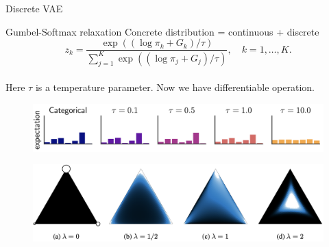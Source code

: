 \begin{frame}{Discrete VAE}
	\vspace{-0.3cm}
	\begin{block}{Gumbel-Softmax relaxation}
		Concrete distribution = continuous + discrete
		\vspace{-0.2cm}
		\[
			z_k = \frac{\exp ((\log \pi_k + G_k) / \tau)}{\sum_{j=1}^K \exp ((\log \pi_j + G_j) / \tau)}, \quad k = 1, \dots, K.
		\]
		\vspace{-0.4cm} \\
		Here $\tau$ is a temperature parameter. Now we have differentiable operation.
 	\end{block}
 	\vspace{-0.2cm}
 	\begin{figure}
 		\includegraphics[width=0.8\linewidth]{figs/gumbel_softmax}
 	\end{figure}
 	\vspace{-0.7cm}
 	\begin{figure}
 		\includegraphics[width=0.8\linewidth]{figs/simplex}
 	\end{figure} 
\end{frame}
